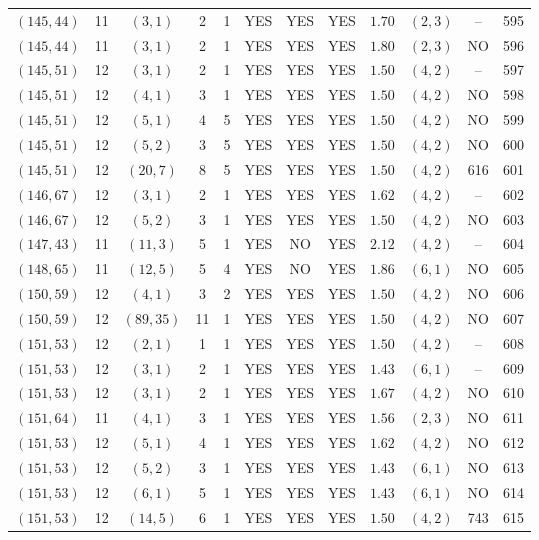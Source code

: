\begin{longtable}{|c|c|c|c|c|c|c|c|c|c|c|c|}
$(145,44)$ & 11 & $(3,1)$ & 2 & 1 & YES & YES & YES & $1.70$ & $(2,3)$ & -- & 595\\
$(145,44)$ & 11 & $(3,1)$ & 2 & 1 & YES & YES & YES & $1.80$ & $(2,3)$ & NO & 596\\
$(145,51)$ & 12 & $(3,1)$ & 2 & 1 & YES & YES & YES & $1.50$ & $(4,2)$ & -- & 597\\
$(145,51)$ & 12 & $(4,1)$ & 3 & 1 & YES & YES & YES & $1.50$ & $(4,2)$ & NO & 598\\
$(145,51)$ & 12 & $(5,1)$ & 4 & 5 & YES & YES & YES & $1.50$ & $(4,2)$ & NO & 599\\
$(145,51)$ & 12 & $(5,2)$ & 3 & 5 & YES & YES & YES & $1.50$ & $(4,2)$ & NO & 600\\
$(145,51)$ & 12 & $(20,7)$ & 8 & 5 & YES & YES & YES & $1.50$ & $(4,2)$ & 616 & 601\\
$(146,67)$ & 12 & $(3,1)$ & 2 & 1 & YES & YES & YES & $1.62$ & $(4,2)$ & -- & 602\\
$(146,67)$ & 12 & $(5,2)$ & 3 & 1 & YES & YES & YES & $1.50$ & $(4,2)$ & NO & 603\\
$(147,43)$ & 11 & $(11,3)$ & 5 & 1 & YES & NO & YES & $2.12$ & $(4,2)$ & -- & 604\\
$(148,65)$ & 11 & $(12,5)$ & 5 & 4 & YES & NO & YES & $1.86$ & $(6,1)$ & NO & 605\\
$(150,59)$ & 12 & $(4,1)$ & 3 & 2 & YES & YES & YES & $1.50$ & $(4,2)$ & NO & 606\\
$(150,59)$ & 12 & $(89,35)$ & 11 & 1 & YES & YES & YES & $1.50$ & $(4,2)$ & NO & 607\\
$(151,53)$ & 12 & $(2,1)$ & 1 & 1 & YES & YES & YES & $1.50$ & $(4,2)$ & -- & 608\\
$(151,53)$ & 12 & $(3,1)$ & 2 & 1 & YES & YES & YES & $1.43$ & $(6,1)$ & -- & 609\\
$(151,53)$ & 12 & $(3,1)$ & 2 & 1 & YES & YES & YES & $1.67$ & $(4,2)$ & NO & 610\\
$(151,64)$ & 11 & $(4,1)$ & 3 & 1 & YES & YES & YES & $1.56$ & $(2,3)$ & NO & 611\\
$(151,53)$ & 12 & $(5,1)$ & 4 & 1 & YES & YES & YES & $1.62$ & $(4,2)$ & NO & 612\\
$(151,53)$ & 12 & $(5,2)$ & 3 & 1 & YES & YES & YES & $1.43$ & $(6,1)$ & NO & 613\\
$(151,53)$ & 12 & $(6,1)$ & 5 & 1 & YES & YES & YES & $1.43$ & $(6,1)$ & NO & 614\\
$(151,53)$ & 12 & $(14,5)$ & 6 & 1 & YES & YES & YES & $1.50$ & $(4,2)$ & 743 & 615\\

\end{longtable}

